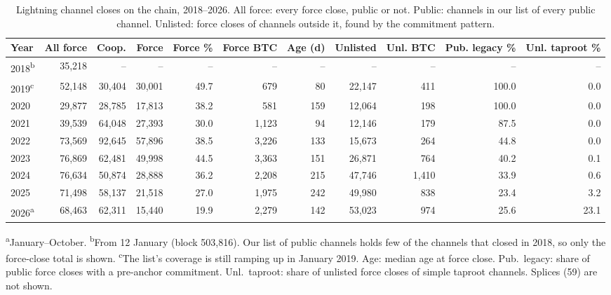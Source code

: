 \begin{table}[t]
\centering
\caption{Lightning channel closes on the chain, 2018--2026. All force: every force close, public or not. Public: channels in our list of every public channel. Unlisted: force closes of channels outside it, found by the commitment pattern.}
\label{tab:census}
\footnotesize
\begin{tabular}{lrrrrrrrrrr}
\toprule
Year & All force & Coop. & Force & Force \% & Force BTC & Age (d) & Unlisted & Unl. BTC & Pub. legacy \% & Unl. taproot \% \\
\midrule
2018\textsuperscript{b} & 35{,}218 & -- & -- & -- & -- & -- & -- & -- & -- & -- \\
2019\textsuperscript{c} & 52{,}148 & 30{,}404 & 30{,}001 & 49.7 & 679 & 80 & 22{,}147 & 411 & 100.0 & 0.0 \\
2020 & 29{,}877 & 28{,}785 & 17{,}813 & 38.2 & 581 & 159 & 12{,}064 & 198 & 100.0 & 0.0 \\
2021 & 39{,}539 & 64{,}048 & 27{,}393 & 30.0 & 1{,}123 & 94 & 12{,}146 & 179 & 87.5 & 0.0 \\
2022 & 73{,}569 & 92{,}645 & 57{,}896 & 38.5 & 3{,}226 & 133 & 15{,}673 & 264 & 44.8 & 0.0 \\
2023 & 76{,}869 & 62{,}481 & 49{,}998 & 44.5 & 3{,}363 & 151 & 26{,}871 & 764 & 40.2 & 0.1 \\
2024 & 76{,}634 & 50{,}874 & 28{,}888 & 36.2 & 2{,}208 & 215 & 47{,}746 & 1{,}410 & 33.9 & 0.6 \\
2025 & 71{,}498 & 58{,}137 & 21{,}518 & 27.0 & 1{,}975 & 242 & 49{,}980 & 838 & 23.4 & 3.2 \\
2026\textsuperscript{a} & 68{,}463 & 62{,}311 & 15{,}440 & 19.9 & 2{,}279 & 142 & 53{,}023 & 974 & 25.6 & 23.1 \\
\bottomrule
\end{tabular}
\par\smallskip\parbox{\linewidth}{\scriptsize \textsuperscript{a}January--October. \textsuperscript{b}From 12 January (block 503,816). Our list of public channels holds few of the channels that closed in 2018, so only the force-close total is shown. \textsuperscript{c}The list's coverage is still ramping up in January 2019. Age: median age at force close. Pub.\ legacy: share of public force closes with a pre-anchor commitment. Unl.\ taproot: share of unlisted force closes of simple taproot channels. Splices (59) are not shown.}
\end{table}

